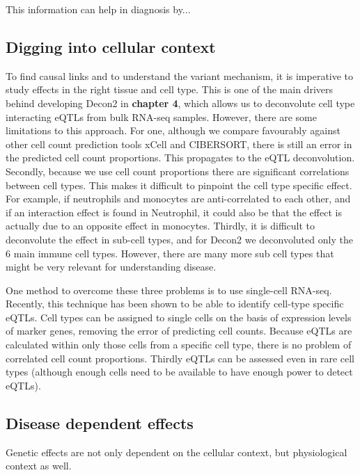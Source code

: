 This information can help in diagnosis by...


\subsection{Digging into cellular context}
To find causal links and to understand the variant mechanism, it is imperative to study effects in the right tissue and cell type. This is one of the main drivers behind developing Decon2 in \textbf{chapter 4}, which allows us to deconvolute cell type interacting eQTLs from bulk RNA-seq samples. However, there are some limitations to this approach. For one, although we compare favourably against other cell count prediction tools xCell\cite{aranXCellDigitallyPortraying2017} and CIBERSORT\cite{newmanRobustEnumerationCell2015}, there is still an error in the predicted cell count proportions. This propagates to the eQTL deconvolution. Secondly, because we use cell count proportions there are significant correlations between cell types. This makes it difficult to pinpoint the cell type specific effect. For example, if neutrophils and monocytes are anti-correlated to each other, and if an interaction effect is found in Neutrophil, it could also be that the effect is actually due to an opposite effect in monocytes. Thirdly, it is difficult to deconvolute the effect in sub-cell types, and for Decon2 we deconvoluted only the 6 main immune cell types. However, there are many more sub cell types that might be very relevant for understanding disease.

One method to overcome these three problems is to use single-cell RNA-seq\cite{tangMRNASeqWholetranscriptomeAnalysis2009}. Recently, this technique has been shown to be able to identify cell-type specific eQTLs\cite{vanderwijstSinglecellRNASequencing2018b}. Cell types can be assigned to single cells on the basis of expression levels of marker genes, removing the error of predicting cell counts. Because eQTLs are calculated within only those cells from a specific cell type, there is no problem of correlated cell count proportions. Thirdly eQTLs can be assessed even in rare cell types (although enough cells need to be available to have enough power to detect eQTLs).

\subsection{Disease dependent effects}
Genetic effects are not only dependent on the cellular context, but physiological context as well. 

